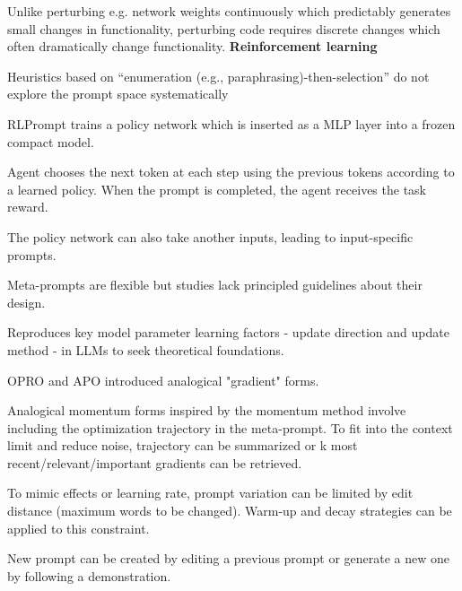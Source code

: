 Unlike perturbing e.g. network weights continuously which predictably generates small changes in functionality, perturbing code requires discrete changes which often dramatically change functionality. \cite{lehman2022evolutionlargemodels}
\textbf{Reinforcement learning}

Heuristics based on “enumeration (e.g., paraphrasing)-then-selection” do not explore the prompt space systematically \cite{deng2022rlpromptoptimizingdiscretetext}

RLPrompt trains a policy network which is inserted as a MLP layer into a frozen compact model. \cite{deng2022rlpromptoptimizingdiscretetext}

Agent chooses the next token at each step using the previous tokens according to a learned policy. When the prompt is completed, the agent receives the task reward. \cite{deng2022rlpromptoptimizingdiscretetext}

The policy network can also take another inputs, leading to input-specific prompts. \cite{deng2022rlpromptoptimizingdiscretetext}



Meta-prompts are flexible but studies lack principled guidelines about their design. \cite{tang2024unleashingpotentiallargelanguage}

Reproduces key model parameter learning factors - update direction and update method - in LLMs to seek theoretical foundations. \cite{tang2024unleashingpotentiallargelanguage}

OPRO\cite{yang2024largelanguagemodelsoptimizers} and APO\cite{pryzant2023automaticpromptoptimizationgradient} introduced analogical "gradient" forms. \cite{tang2024unleashingpotentiallargelanguage}

Analogical momentum forms inspired by the momentum method involve including the optimization trajectory in the meta-prompt. To fit into the context limit and reduce noise, trajectory can be summarized or k most recent/relevant/important gradients can be retrieved. \cite{tang2024unleashingpotentiallargelanguage}

To mimic effects or learning rate, prompt variation can be limited by edit distance (maximum words to be changed). Warm-up and decay strategies can be applied to this constraint. \cite{tang2024unleashingpotentiallargelanguage}

New prompt can be created by editing a previous prompt or generate a new one by following a demonstration. \cite{tang2024unleashingpotentiallargelanguage}


